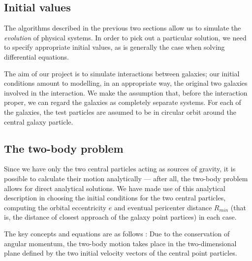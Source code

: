 \documentclass[11pt,twocolumn]{article}
\begin{document}
        \subsection{Initial values }
The algorithms described in the previous two sections allow us to simulate the {\em evolution} of physical systems. In order to pick out a particular solution, we need to specify appropriate initial values, as is generally the case when solving differential equations.

The aim of our project is to simulate interactions between galaxies; our initial conditions amount to modelling, in an appropriate way, the original two galaxies involved in the interaction. We make the assumption that, before the interaction proper, we can regard the galaxies as completely separate systems. For each of the galaxies, the test particles are assumed to be in circular orbit around the central galaxy particle.

\subsection{The  two-body problem} \label{rmin}

Since we have only the two central particles acting as sources of gravity, it is possible to calculate their motion analytically --- after all, the two-body problem allows for direct analytical solutions. We have made use of this analytical description in choosing the initial conditions for the two central particles, computing the orbital eccentricity $e$ and eventual pericenter distance $R_{min}$ (that is, the distance of closest approach of the galaxy point partices) in each case. 

The key concepts and equations are as follows \cite[chapter 9]{1965mech.book.....K}: Due to the conservation of angular momentum, the two-body motion takes place in the two-dimensional plane defined by the two initial velocity vectors of the central point particles. 
        
\end{document}
